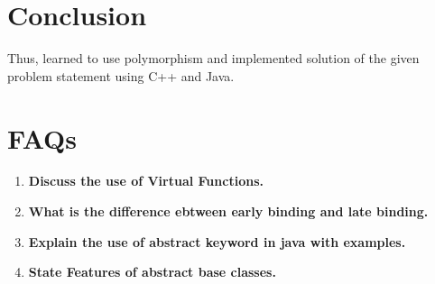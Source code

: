 \documentclass[11pt]{article}
\begin{document}
\pagebreak

\section{Conclusion}
Thus, learned to use polymorphism and implemented solution of the given problem statement using C++ and Java. 

\section{FAQs}

\begin{enumerate}
	\item \textbf{Discuss the use of Virtual Functions. }
	\item \textbf{What is the difference ebtween early binding and late binding. }
	\item \textbf{Explain the use of abstract keyword in java with examples.}
	\item \textbf{State Features of abstract base classes.} 
\end{enumerate}
\end{document}
